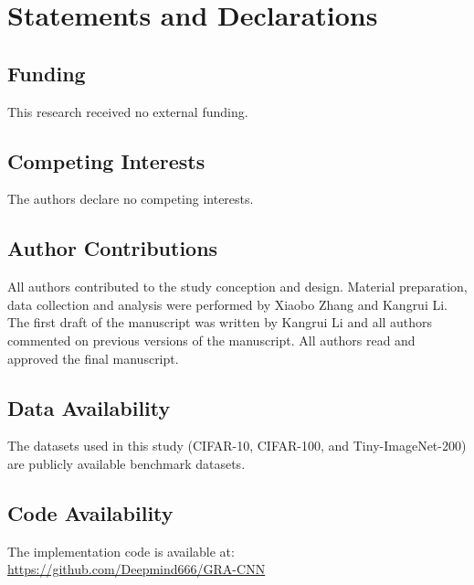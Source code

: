 \documentclass[sn-mathphys,Numbered]{sn-jnl}
\begin{document}
\section*{Statements and Declarations}

\subsection*{Funding}
This research received no external funding.

\subsection*{Competing Interests}
The authors declare no competing interests.

\subsection*{Author Contributions}
All authors contributed to the study conception and design. Material preparation, data collection and analysis were performed by Xiaobo Zhang and Kangrui Li. The first draft of the manuscript was written by Kangrui Li and all authors commented on previous versions of the manuscript. All authors read and approved the final manuscript.

\subsection*{Data Availability}
The datasets used in this study (CIFAR-10, CIFAR-100, and Tiny-ImageNet-200) are publicly available benchmark datasets.

\subsection*{Code Availability}
The implementation code is available at: \url{https://github.com/Deepmind666/GRA-CNN}

\clearpage

\nocite{*}

\end{document}
